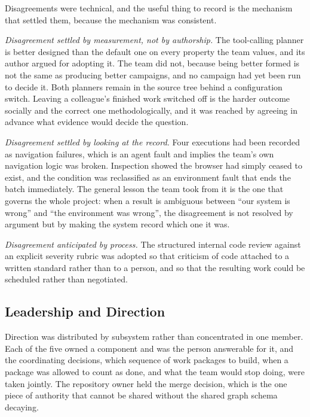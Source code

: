 Disagreements were technical, and the useful thing to record is the mechanism
that settled them, because the mechanism was consistent.

\emph{Disagreement settled by measurement, not by authorship.} The tool-calling
planner is better designed than the default one on every property the team
values, and its author argued for adopting it. The team did not, because being
better formed is not the same as producing better campaigns, and no campaign
had yet been run to decide it. Both planners remain in the source tree behind a
configuration switch. Leaving a colleague's finished work switched off is the
harder outcome socially and the correct one methodologically, and it was
reached by agreeing in advance what evidence would decide the question.

\emph{Disagreement settled by looking at the record.} Four executions had been
recorded as navigation failures, which is an agent fault and implies the
team's own navigation logic was broken. Inspection showed the browser had
simply ceased to exist, and the condition was reclassified as an environment
fault that ends the batch immediately. The general lesson the team took from it
is the one that governs the whole project: when a result is ambiguous between
``our system is wrong'' and ``the environment was wrong'', the disagreement is
not resolved by argument but by making the system record which one it was.

\emph{Disagreement anticipated by process.} The structured internal code review
against an explicit severity rubric was adopted so that criticism of code
attached to a written standard rather than to a person, and so that the
resulting work could be scheduled rather than negotiated.

\subsection{Leadership and Direction}
\label{sec:leadership}

Direction was distributed by subsystem rather than concentrated in one member.
Each of the five owned a component and was the person answerable for it, and
the coordinating decisions, which sequence of work packages to build, when a
package was allowed to count as done, and what the team would stop doing, were
taken jointly. The repository owner held the merge decision, which is the one
piece of authority that cannot be shared without the shared graph schema
decaying.

